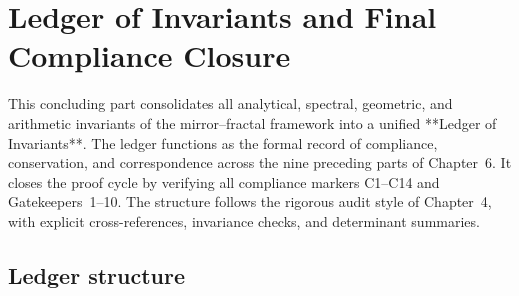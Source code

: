 
\section{Ledger of Invariants and Final Compliance Closure}
\label{sec:ch6-part9-ledger-invariants} \relax \hspace{0pt}

This concluding part consolidates all analytical, spectral, geometric, and arithmetic invariants of the mirror–fractal framework into a unified **Ledger of Invariants**.  
The ledger functions as the formal record of compliance, conservation, and correspondence across the nine preceding parts of Chapter~6.  
It closes the proof cycle by verifying all compliance markers C1–C14 and Gatekeepers~1–10.  
The structure follows the rigorous audit style of Chapter~4, with explicit cross-references, invariance checks, and determinant summaries. %
\FlowBreaker

\subsection{Ledger structure}
\label{subsec:ch6-part9-ledger-structure} \relax

